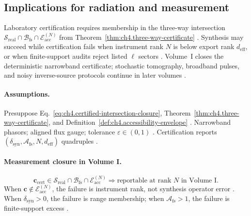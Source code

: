 ﻿\subsection{Implications for radiation and measurement}
\label{sec:ch494}

Laboratory certification requires membership in the three-way intersection \(\mathcal{S}_{\mathrm{real}}\cap\mathcal{B}_{\mathrm{fs}}\cap\mathcal{E}_{\mathrm{acc}}^{(N)}\)
from Theorem~\ref{thm:ch4.three-way-certificate} \cite{harrington2001,devaney2004,hansen1988,stratton1941}. Synthesis may succeed while certification fails
when instrument rank \(N\) is below export rank \(d_{\mathrm{eff}}\), or when finite-support audits reject listed \(\ell\) sectors \cite{jackson1999}.
Volume~I closes the deterministic narrowband certificate; stochastic tomography, broadband pulses, and noisy inverse-source protocols continue in later volumes
\cite{harrington2001,devaney2004}.

\paragraph{Assumptions.}
Presuppose Eq.~\eqref{eq:ch4.certified-intersection-closure}, Theorem~\ref{thm:ch4.three-way-certificate}, and
Definition~\ref{def:ch4.accessibility-envelope} \cite{harrington2001,devaney2004,stratton1941,hansen1988}. Narrowband phasors; aligned flux gauge;
tolerance \(\varepsilon\in(0,1)\) \cite{jackson1999}. Certification reports \((\delta_{\mathrm{syn}},\mathcal{A}_{\mathrm{fs}},N,d_{\mathrm{eff}})\) quadruples
\cite{collin2001,harrington2001}.

\paragraph{Measurement closure in Volume I.}
\begin{equation}
\label{eq:ch4.volume-I-measurement-cert}
\mathbf{c}_{\mathrm{cert}}\in\mathcal{S}_{\mathrm{real}}\cap\mathcal{B}_{\mathrm{fs}}\cap\mathcal{E}_{\mathrm{acc}}^{(N)}
\Longrightarrow
\text{reportable at rank }N\text{ in Volume I}.
\end{equation}
When \(\mathbf{c}\notin\mathcal{E}_{\mathrm{acc}}^{(N)}\), the failure is instrument rank, not synthesis operator error \cite{harrington2001,devaney2004,hansen1988}.
When \(\delta_{\mathrm{syn}}>0\), the failure is range membership; when \(\mathcal{A}_{\mathrm{fs}}>1\), the failure is finite-support excess
\cite{stratton1941,jackson1999}.

